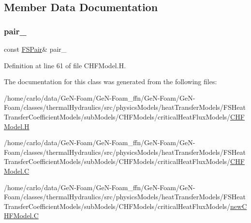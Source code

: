 \subsection{Member Data Documentation}
\mbox{\label{classFoam_1_1CHFModel_a587e19a1b4f4b498d2604d20c093a73b}} 
\subsubsection{\texorpdfstring{pair\+\_\+}{pair\_}}
{\footnotesize\ttfamily const \hyperlink{classFoam_1_1FSPair}{F\+S\+Pair}\& pair\+\_\+\hspace{0.3cm}{\ttfamily [protected]}}



Definition at line 61 of file C\+H\+F\+Model.\+H.



The documentation for this class was generated from the following files\+:\begin{DoxyCompactItemize}
\item 
/home/carlo/data/\+Ge\+N-\/\+Foam/\+Ge\+N-\/\+Foam\+\_\+ffn/\+Ge\+N-\/\+Foam/\+Ge\+N-\/\+Foam/classes/thermal\+Hydraulics/src/physics\+Models/heat\+Transfer\+Models/\+F\+S\+Heat\+Transfer\+Coefficient\+Models/sub\+Models/\+C\+H\+F\+Models/critical\+Heat\+Flux\+Models/\hyperlink{CHFModel_8H}{C\+H\+F\+Model.\+H}\item 
/home/carlo/data/\+Ge\+N-\/\+Foam/\+Ge\+N-\/\+Foam\+\_\+ffn/\+Ge\+N-\/\+Foam/\+Ge\+N-\/\+Foam/classes/thermal\+Hydraulics/src/physics\+Models/heat\+Transfer\+Models/\+F\+S\+Heat\+Transfer\+Coefficient\+Models/sub\+Models/\+C\+H\+F\+Models/critical\+Heat\+Flux\+Models/\hyperlink{CHFModel_8C}{C\+H\+F\+Model.\+C}\item 
/home/carlo/data/\+Ge\+N-\/\+Foam/\+Ge\+N-\/\+Foam\+\_\+ffn/\+Ge\+N-\/\+Foam/\+Ge\+N-\/\+Foam/classes/thermal\+Hydraulics/src/physics\+Models/heat\+Transfer\+Models/\+F\+S\+Heat\+Transfer\+Coefficient\+Models/sub\+Models/\+C\+H\+F\+Models/critical\+Heat\+Flux\+Models/\hyperlink{newCHFModel_8C}{new\+C\+H\+F\+Model.\+C}\end{DoxyCompactItemize}

